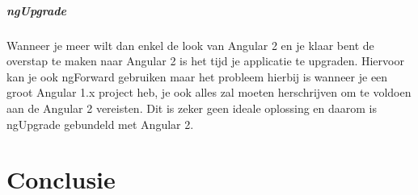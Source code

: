 \documentclass[pdftex,a4paper,12pt,twoside]{report}
\begin{document}
\paragraph{ngUpgrade}
Wanneer je meer wilt dan enkel de look van Angular 2 en je klaar bent de overstap te maken naar Angular 2 is het tijd je applicatie te upgraden. Hiervoor kan je ook ngForward gebruiken maar het probleem hierbij is wanneer je een groot Angular 1.x project heb, je ook alles zal moeten herschrijven om te voldoen aan de Angular 2 vereisten. Dit is zeker geen ideale oplossing en daarom is ngUpgrade gebundeld met Angular 2. 




\chapter{Conclusie}
\label{ch:conclusie}







\listoffigures
\listoftables
\end{document}
